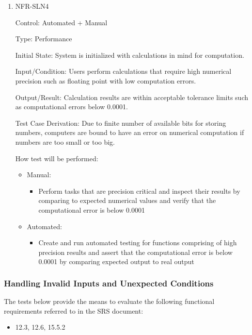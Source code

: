 \documentclass[12pt, titlepage]{article}
\begin{document}
\begin{enumerate}
\item NFR-SLN4

Control: Automated + Manual

Type: Performance

Initial State: System is initialized with calculations in mind for computation.

Input/Condition: Users perform calculations that require high numerical precision such as floating point with low computation errors.

Output/Result: Calculation results are within acceptable tolerance limits such as computational errors below 0.0001.

Test Case Derivation: Due to finite number of available bits for storing numbers, computers are bound to have an error on numerical computation if numbers are too small or too big.

How test will be performed:
\begin{itemize}
  \item Manual:
  \begin{itemize}
    \item Perform tasks that are precision critical and inspect their results by comparing to expected numerical values and verify that the computational error is below 0.0001
  \end{itemize}
  \item Automated:
  \begin{itemize}
    \item Create and run automated testing for functions comprising of high precision results and assert that the computational error is below 0.0001 by comparing expected output to real output
  \end{itemize}
\end{itemize}

\end{enumerate}

\subsubsection{Handling Invalid Inputs and Unexpected Conditions}

The tests below provide the means to evaluate the following functional requirements referred to in the SRS document:
\begin{itemize}
  \item 12.3, 12.6, 15.5.2
\end{itemize}
\end{document}
